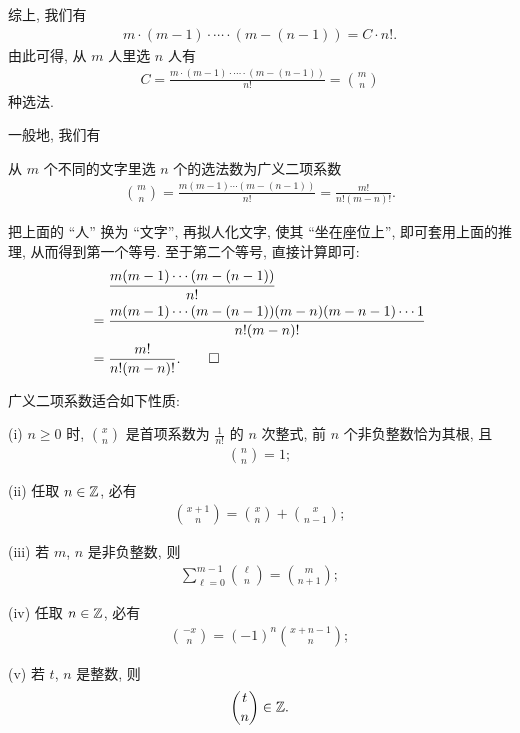 综上, 我们有
\begin{align*}
    m \cdot (m-1) \cdot \cdots \cdot (m - (n - 1)) = C \cdot n!.
\end{align*}
由此可得, 从 $m$ 人里选 $n$ 人有
\begin{align*}
    C = \frac{m \cdot (m-1) \cdot \cdots \cdot (m - (n - 1))}{n!} = \binom{m}{n}
\end{align*}
种选法.

一般地, 我们有

\begin{proposition}
    从 $m$ 个不同的文字里选 $n$ 个的选法数为广义二项系数
    \begin{align*}
        \binom{m}{n} = \frac{m(m-1)\cdots(m - (n - 1))}{n!} = \frac{m!}{n! (m-n)!}.
    \end{align*}
\end{proposition}

\begin{pf}
    把上面的 ``人'' 换为 ``文字'', 再拟人化文字, 使其 ``坐在座位上'', 即可套用上面的推理, 从而得到第一个等号. 至于第二个等号, 直接计算即可:
    \begin{align*}
             & \frac{m(m-1)\cdots(m - (n - 1))}{n!}                                      \\
        = {} & \frac{m(m-1)\cdots(m - (n - 1))(m - n) (m - n - 1) \cdots 1}{n! (m - n)!} \\
        = {} & \frac{m!}{n! (m-n)!}. \qedhere
    \end{align*}
\end{pf}

\begin{proposition}
    广义二项系数适合如下性质:

    (i) $n \geq 0$ 时, $\binom{x}{n}$ 是首项系数为 $\frac{1}{n!}$ 的 $n$ 次整式, 前 $n$ 个非负整数恰为其根, 且
    \begin{align*}
        \binom{n}{n} = 1;
    \end{align*}

    (ii) 任取 $n \in \mathbb{Z}$, 必有
    \begin{align*}
        \binom{x + 1}{n} = \binom{x}{n} + \binom{x}{n - 1};
    \end{align*}

    (iii) 若 $m$, $n$ 是非负整数, 则
    \begin{align*}
        \sum_{\ell = 0}^{m - 1} \binom{\ell}{n} = \binom{m}{n + 1};
    \end{align*}

    (iv) 任取 $n \in \mathbb{Z}$, 必有
    \begin{align*}
        \binom{-x}{n} = (-1)^n \binom{x + n - 1}{n};
    \end{align*}

    (v) 若 $t$, $n$ 是整数, 则
    \begin{align*}
        \binom{t}{n} \in \mathbb{Z}.
    \end{align*}
\end{proposition}

